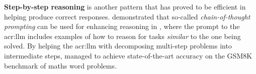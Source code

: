 \textbf{Step-by-step reasoning} is another pattern that has proved to be efficient in helping  produce correct responses. \cite{weiChainofThoughtPromptingElicits2023a} demonstrated that so-called \textit{chain-of-thought prompting} can be used for enhancing reasoning in , where the prompt to the \acrshort{acr:llm} includes examples of how to reason for tasks \textit{similar} to the one being solved. By helping the \acrshort{acr:llm} with decomposing multi-step problems into intermediate steps, \citeauthor{weiChainofThoughtPromptingElicits2023a} managed to achieve state-of-the-art accuracy on the GSM8K benchmark of maths word problems.


\glsresetall
